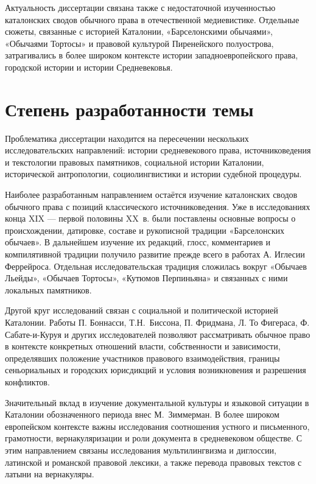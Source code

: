 Актуальность диссертации связана также с недостаточной изученностью каталонских сводов обычного права в отечественной медиевистике. Отдельные сюжеты, связанные с историей Каталонии, «Барселонскими обычаями», «Обычаями Тортосы» и правовой культурой Пиренейского полуострова, затрагивались в более широком контексте истории западноевропейского права, городской истории и истории Средневековья.

\section*{Степень разработанности темы}

Проблематика диссертации находится на пересечении нескольких исследовательских направлений: истории средневекового права, источниковедения и текстологии правовых памятников, социальной истории Каталонии, исторической антропологии, социолингвистики и истории судебной процедуры.

Наиболее разработанным направлением остаётся изучение каталонских сводов обычного права с позиций классического источниковедения. Уже в исследованиях конца XIX --- первой половины XX~в. были поставлены основные вопросы о происхождении, датировке, составе и рукописной традиции «Барселонских обычаев». В дальнейшем изучение их редакций, глосс, комментариев и компилятивной традиции получило развитие прежде всего в работах А. Иглесии Феррейроса. Отдельная исследовательская традиция сложилась вокруг «Обычаев Льейды», «Обычаев Тортосы», «Кутюмов Перпиньяна» и связанных с ними локальных памятников.

Другой круг исследований связан с социальной и политической историей Каталонии. Работы П. Боннасси, Т.Н.~Биссона, П. Фридмана, Л. То Фигераса, Ф. Сабате-и-Куруя и других исследователей позволяют рассматривать обычное право в контексте конкретных отношений власти, собственности и зависимости, определявших положение участников правового взаимодействия, границы сеньориальных и городских юрисдикций и условия возникновения и разрешения конфликтов.

Значительный вклад в изучение документальной культуры и языковой ситуации в Каталонии обозначенного периода внес М.~Зиммерман. В более широком европейском контексте важны исследования соотношения устного и письменного, грамотности, вернакуляризации и роли документа в средневековом обществе. С этим направлением связаны исследования мультилингвизма и диглоссии, латинской и романской правовой лексики, а также перевода правовых текстов с латыни на вернакуляры.

